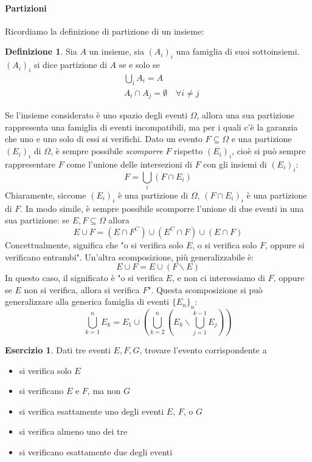 \documentclass{article}
\theoremstyle{plain}
\theoremstyle{definition}
\newtheorem{definizione}{Definizione}[section]
\newtheorem{esercizio}{Esercizio}[section]
\theoremstyle{remark}
\begin{document}
\paragraph{Partizioni} %
\label{par:partizioni}
Ricordiamo la definizione di partizione di un insieme:
\begin{definizione}
	Sia $A$ un insieme, sia $(A_i)_i$ una famiglia di suoi sottoinsiemi. $(A_i)_i$ si dice partizione di $A$ se e solo se
	\begin{align*}
		&\bigcup_i A_i =A\\
		&A_i\cap A_j =\emptyset \quad\forall i\neq j
	\end{align*}
\end{definizione}
Se l'insieme considerato è uno spazio degli eventi $\Omega$, allora una sua partizione rappresenta una famiglia di eventi incompatibili, ma per i quali c'è la garanzia che uno e uno solo di essi si verifichi. Dato un evento $F\subseteq\Omega$ e una partizione $(E_i)_i$ di $\Omega$, è sempre possibile \textit{scomporre} $F$ rispetto $(E_i)_i$, cioè si può sempre rappresentare $F$ come l'unione delle intersezioni di $F$ con gli insiemi di $(E_i)_i$:
\begin{equation*}
	F=\bigcup_i (F\cap E_i)
\end{equation*}
Chiaramente, siccome $(E_i)_i$ è una partizione di $\Omega$, $(F\cap E_i)_i$ è una partizione di $F$. In modo simile, è sempre possibile scomporre l'unione di due eventi in una sua partizione: se $E,F\subseteq\Omega$ allora
\begin{equation*}
	E\cup F=(E\cap F^C)\cup(E^C\cap F)\cup (E\cap F)
\end{equation*}
Concettualmente, significa che "o si verifica solo $E$, o si verifica solo $F$, oppure si verificano entrambi". Un'altra scomposizione, più generalizzabile è:
\begin{equation*}
	E\cup F=E\cup(F\smallsetminus E)
\end{equation*}
In questo caso, il significato è "o si verifica $E$, e non ci interessiamo di $F$, oppure se $E$ non si verifica, allora si verifica $F$". Questa scomposizione si può generalizzare alla generica famiglia di eventi $\{E_n\}_n$:
\begin{equation*}
	\bigcup_{k=1}^n E_k=E_1 \cup\left(\bigcup_{k=2}^n \left(E_k\smallsetminus\bigcup_{j=1}^{k-1} E_j\right)\right)
\end{equation*}
\begin{esercizio}
	Dati tre eventi $E,F,G$, trovare l'evento corrispondente a
	\begin{itemize}
		\item si verifica solo $E$
		\item si verificano $E$ e $F$, ma non $G$
		\item si verifica esattamente uno degli eventi $E$, $F$, o $G$
		\item si verifica almeno uno dei tre
		\item si verificano esattamente due degli eventi
	\end{itemize}
\end{esercizio}
\end{document}
